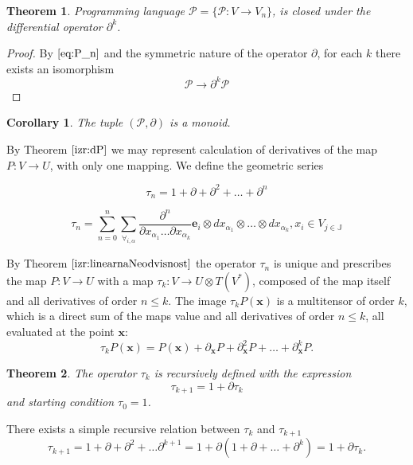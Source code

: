 \documentclass{article}
\newcommand{\JJ}{\mathbb{J}}
\newcommand{\e}{\mathbf{e}}
\newcommand{\x}{\mathbf{x}}
\newcommand{\dP}{\mathcal{P}}
\newcommand{\D}{\partial}
\newcommand{\sumd}{\tau}
\newtheorem{izrek}{Theorem}[section]
\newtheorem{corollary}{Corollary}[section]
\begin{document}
 \begin{izrek}\label{izr:dP}
	Programming language $\dP=\{\dP:V\to V_n\}$, is closed under the differential operator $\D^k$.
 \end{izrek}
 
 \begin{proof}
 	 By $\eqref{eq:P_n}$ and the symmetric nature of the operator $\D$, for each $k$ there exists an isomorphism
 	 	\begin{equation}
 	 		\dP\to\D^k\dP
 	 	\end{equation}
 \end{proof}

\begin{corollary}\label{cor:dpMonoid}
The tuple $(\dP,\D)$ is a monoid.
\end{corollary}

By Theorem $\ref{izr:dP}$ we may represent calculation of derivatives of the map $P:V\to U$, with only one mapping. We define the geometric series
 
 \begin{equation}\label{eq:DD}
  	\sumd_n = 1+\D +\D^2 +\ldots + \D^n 
  \end{equation}
  
  
  \begin{equation}
  	\sumd_n=\sum\limits_{n=0}^{n}\sum_{\forall_{i,\alpha}}\frac{\partial^n}{\partial
  		    x_{\alpha_1}\ldots \partial x_{\alpha_k}}\e_i\otimes
  		  dx_{\alpha_1}\otimes\ldots \otimes dx_{\alpha_k} , x_i\in V_{j\in\JJ}
  \end{equation}
  
  By Theorem $\ref{izr:linearnaNeodvisnost}$ the operator $\sumd_n$ is unique and prescribes the map $P: V\to U$ with a map $\sumd_k:V\to
U\otimes T(V^*)$, composed of the map itself and all derivatives of order $n\le k$. The image $\sumd_kP(\x)$ is a multitensor of order $k$, which is a direct sum of the maps value and all derivatives of order $n\le k$, all evaluated at the point $\x$:
\begin{equation}
  \label{eq:multi_odvod}
  \sumd_kP(\x) = P(\x)+\D_\x P + \D^2_\x P + \ldots + \D^k_\x P.
\end{equation}
\begin{izrek}\label{izr:tauRek}
  The operator $\sumd_k$ is recursively defined with the expression
  \begin{equation}
    \label{eq:potenca(1+d)}
    \sumd_{k+1}=1+\D\sumd_{k}
  \end{equation}
and starting condition $\tau_0=1$.
\end{izrek}
There exists a simple recursive relation between $\sumd_k$ and $\sumd_{k+1}$
\begin{equation}
   \label{eq:rekurzija}
   \sumd_{k+1} = 1 + \D +\D^2+\ldots \D^{k+1} = 1+\D(1+\D+\ldots +\D^{k}) = 1+\D\sumd_k.
\end{equation} 
\end{document}
